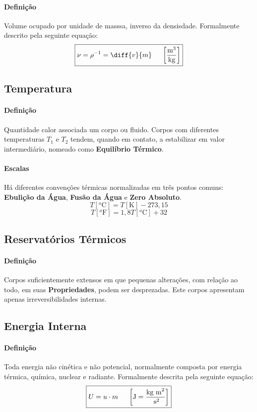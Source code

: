 \documentclass{article}
\begin{document}
            \paragraph{Definição}Volume ocupado por unidade de masssa, inverso da densisdade. Formalmente descrito pela seguinte equação:
                \[\boxed{\nu = \rho^{-1} = \diff{v}{m} \hspace{5mm} \left[\frac{\text{m}^{3}}{\text{kg}}\right]}\]

        \subsection{Temperatura}
            \paragraph{Definição}Quantidade calor associada um corpo ou fluido. Corpos com diferentes temperaturas $T_{1}$ e $T_{2}$ tendem, quando em contato, a estabilizar em valor intermediário, nomeado como \textbf{Equilíbrio Térmico}.

            \paragraph{Escalas}Há diferentes convenções térmicas normalizadas em três pontos comuns: \textbf{Ebulição da Água}, \textbf{Fusão da Água} e \textbf{Zero Absoluto}. 
                \[T[^{o}\text{C}] = T[\text{K}] - 273,15\]
                \[T[^{o}\text{F}] = 1,8T[^{o}\text{C}] + 32\]

        \subsection{Reservatórios Térmicos}
            \paragraph{Definição}Corpos suficientemente extensos em que pequenas alterações, com relação ao todo, em suas \textbf{Propriedades}, podem ser desprezadas. Este corpos apresentam apenas irreversibilidades internas.

        \subsection{Energia Interna}
            \paragraph{Definição}Toda energia não cinética e não potencial, normalmente composta por energia térmica, química, nuclear e radiante. Formalmente descrita pela seguinte equação:
                \[\boxed{U = u \cdot m \hspace{5mm} \left[\text{J} = \frac{\text{kg m}^{2}}{\text{ s}^{2}}\right]}\]
\end{document}
